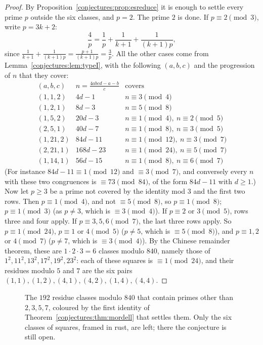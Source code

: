 \begin{proof}
By Proposition~\ref{conjectures:prop:esreduce} it is enough to settle every prime $p$ outside the six classes, and $p=2$. The prime $2$ is done. If $p\equiv2\pmod3$,
write $p=3k+2$:
\[
\frac4p=\frac1p+\frac1{k+1}+\frac1{(k+1)p},
\]
since $\frac1{k+1}+\frac1{(k+1)p}=\frac{p+1}{(k+1)p}=\frac3p$. All the other cases come from Lemma~\ref{conjectures:lem:typeI}, with the following $(a,b,c)$ and the
progression of $n$ that they cover:
\[
\begin{array}{lll}
(a,b,c)&n=\frac{4abcd-a-b}c&\text{covers}\\\hline
(1,1,2)&4d-1&n\equiv3\pmod4\\
(1,2,1)&8d-3&n\equiv5\pmod8\\
(1,5,2)&20d-3&n\equiv1\pmod4,\ n\equiv2\pmod5\\
(2,5,1)&40d-7&n\equiv1\pmod8,\ n\equiv3\pmod5\\
(1,21,2)&84d-11&n\equiv1\pmod{12},\ n\equiv3\pmod7\\
(2,21,1)&168d-23&n\equiv1\pmod{24},\ n\equiv5\pmod7\\
(1,14,1)&56d-15&n\equiv1\pmod8,\ n\equiv6\pmod7
\end{array}
\]
(For instance $84d-11\equiv1\pmod{12}$ and $\equiv3\pmod7$, and conversely every $n$ with these two congruences is $\equiv73\pmod{84}$, of the form
$84d-11$ with $d\ge1$.) Now let $p\ge3$ be a prime not covered by the identity mod $3$ and the first two rows. Then $p\equiv1\pmod4$, and not
$\equiv5\pmod8$, so $p\equiv1\pmod8$; $p\equiv1\pmod3$ (as $p\ne3$, which is $\equiv3\pmod4$). If $p\equiv2$ or $3\pmod5$, rows three and four apply. If
$p\equiv3,5,6\pmod7$, the last three rows apply. So $p\equiv1\pmod{24}$, $p\equiv1$ or $4\pmod5$ ($p\ne5$, which is $\equiv5\pmod8$), and $p\equiv1,2$ or
$4\pmod7$ ($p\ne7$, which is $\equiv3\pmod4$). By the Chinese remainder theorem, these are $1\cdot2\cdot3=6$ classes modulo $840$, namely those of
$1^2,11^2,13^2,17^2,19^2,23^2$: each of these squares is $\equiv1\pmod{24}$, and their residues modulo $5$ and $7$ are the six pairs
$(1,1),(1,2),(4,1),(4,2),(1,4),(4,4)$.
\end{proof}

\begin{figure}[ht]
\centering
{}
\caption{The $192$ residue classes modulo $840$ that contain primes other than $2,3,5,7$, coloured by the first identity of Theorem~\ref{conjectures:thm:mordell}
that settles them. Only the six classes of squares, framed in rust, are left; there the conjecture is still open.}
\label{conjectures:fig:es}
\end{figure}

